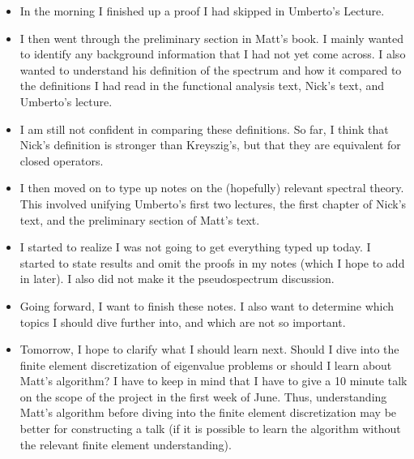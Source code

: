 \documentclass[12pt,a4paper]{article}
\begin{document}
    \begin{itemize}
        \item In the morning I finished up a proof I had skipped in Umberto's Lecture.
        \item I then went through the preliminary section in Matt's book. I mainly wanted to identify any background information that I had not yet come across. I also wanted to understand his definition of the spectrum and how it compared to the definitions I had read in the functional analysis text, Nick's text, and Umberto's lecture. 
        \item I am still not confident in comparing these definitions. So far, I think that Nick's definition is stronger than Kreyszig's, but that they are equivalent for closed operators. 
        \item I then moved on to type up notes on the (hopefully) relevant spectral theory. This involved unifying Umberto's first two lectures, the first chapter of Nick's text, and the preliminary section of Matt's text. 
        \item I started to realize I was not going to get everything typed up today. I started to state results and omit the proofs in my notes (which I hope to add in later). I also did not make it the pseudospectrum discussion. 
        \item Going forward, I want to finish these notes. I also want to determine which topics I should dive further into, and which are not so important. 
        \item Tomorrow, I hope to clarify what I should learn next. Should I dive into the finite element discretization of eigenvalue problems or should I learn about Matt's algorithm? I have to keep in mind that I have to give a 10 minute talk on the scope of the project in the first week of June. Thus, understanding Matt's algorithm before diving into the finite element discretization may be better for constructing a talk (if it is possible to learn the algorithm without the relevant finite element understanding).
    \end{itemize}
\end{document}
